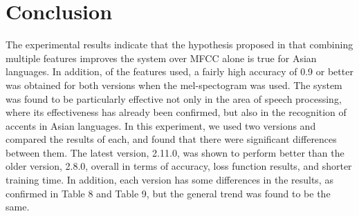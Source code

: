 \documentclass[ams]{U-AizuGT}
\begin{document}
\section{Conclusion}
The experimental results indicate that the hypothesis proposed in \cite{Singh:fea} that combining multiple features improves the system over MFCC alone is true for Asian languages. In addition, of the features used, a fairly high accuracy of 0.9 or better was obtained for both versions when the mel-spectogram was used. The system was found to be particularly effective not only in the area of speech processing, where its effectiveness has already been confirmed, but also in the recognition of accents in Asian languages.
In this experiment, we used two versions and compared the results of each, and found that there were significant differences between them. The latest version, 2.11.0, was shown to perform better than the older version, 2.8.0, overall in terms of accuracy, loss function results, and shorter training time. In addition, each version has some differences in the results, as confirmed in Table 8 and Table 9, but the general trend was found to be the same.

\end{document}
